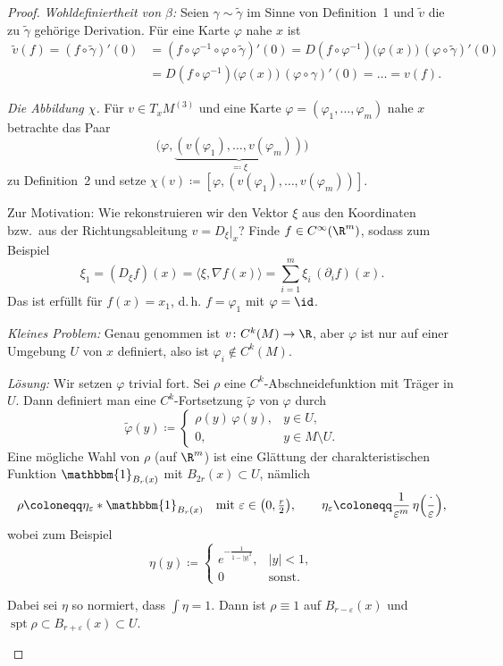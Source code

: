 \documentclass[11pt]{article}
\begin{document}
\begin{proof}
  \textit{Wohldefiniertheit von $\beta$:} Seien $\gamma \sim \tilde{\gamma}$ im Sinne von Definition~1 und $\tilde{v}$ die zu $\tilde{\gamma}$ gehörige Derivation. Für eine Karte $\varphi$ nahe $x$ ist
  \begin{align*}
    \tilde{v}(f) = (f \circ \tilde{\gamma})'(0) &= (f \circ \varphi^{-1} \circ \varphi \circ \tilde{\gamma})'(0) = D(f \circ \varphi^{-1})\bigl(\varphi(x)\bigr)\, (\varphi \circ \tilde{\gamma})'(0) \\
    &= D(f \circ \varphi^{-1})\bigl(\varphi(x)\bigr)\, (\varphi \circ \gamma)'(0) = \dots = v(f).
  \end{align*}


  \textit{Die Abbildung $\chi$.} Für $v \in T_x M^{(3)}$ und eine Karte $\varphi = (\varphi_1, \dots, \varphi_m)$ nahe $x$ betrachte das Paar
  \[ \bigl(\varphi, \underbrace{(v(\varphi_1), \dots, v(\varphi_m))}_{\eqqcolon \xi}\bigr) \]
  zu Definition~2 und setze $\chi(v) \coloneqq [\varphi, (v(\varphi_1), \dots, v(\varphi_m))]$.


  Zur Motivation: Wie rekonstruieren wir den Vektor $\xi$ aus den Koordinaten bzw.\ aus der \glqq Richtungsableitung\grqq{} $v = D_\xi|_x$? Finde $f \in C^\infty(\R^m)$, sodass zum Beispiel
  \[ \xi_1 = (D_\xi f)(x) = \langle \xi, \nabla f(x) \rangle = \sum_{i=1}^{m} \xi_i\, (\partial_i f)(x). \]
  Das ist erfüllt für $f(x) = x_1$, d.\,h. $f = \varphi_1$ mit $\varphi = \id$.


  \textit{Kleines Problem:} Genau genommen ist $v\colon C^k(M) \to \R$, aber $\varphi$ ist nur auf einer Umgebung $U$ von $x$ definiert, also ist $\varphi_i \notin C^k(M)$.


  \textit{Lösung:} Wir setzen $\varphi$ \glqq trivial\grqq{} fort. Sei $\rho$ eine $C^k$-Abschneidefunktion mit Träger in $U$. Dann definiert man eine $C^k$-Fortsetzung $\tilde{\varphi}$ von $\varphi$ durch
  \[ \tilde{\varphi}(y) \coloneqq \begin{cases} \rho(y)\, \varphi(y), & y \in U, \\ 0, & y \in M \setminus U. \end{cases} \]
  Eine mögliche Wahl von $\rho$ (auf $\R^m$) ist eine Glättung der charakteristischen Funktion $\mathbbm{1}_{B_r(x)}$ mit $B_{2r}(x) \subset U$, nämlich
  \[ \rho \coloneqq \eta_\varepsilon * \mathbbm{1}_{B_r(x)} \quad \text{mit } \varepsilon \in \bigl(0, \tfrac{r}{2}\bigr), \qquad \eta_\varepsilon \coloneqq \frac{1}{\varepsilon^m}\, \eta\Bigl(\frac{\cdot}{\varepsilon}\Bigr), \]
  wobei zum Beispiel
  \[ \eta(y) \coloneqq \begin{cases} e^{-\frac{1}{1 - \lvert y \rvert^2}}, & \lvert y \rvert < 1, \\ 0 & \text{sonst}. \end{cases} \]
\begin{ergaenzung}
  Dabei sei $\eta$ so normiert, dass $\int \eta = 1$. Dann ist $\rho \equiv 1$ auf $B_{r-\varepsilon}(x)$ und $\operatorname{spt} \rho \subset B_{r+\varepsilon}(x) \subset U$.
  \end{ergaenzung}



\end{proof}
\end{document}
